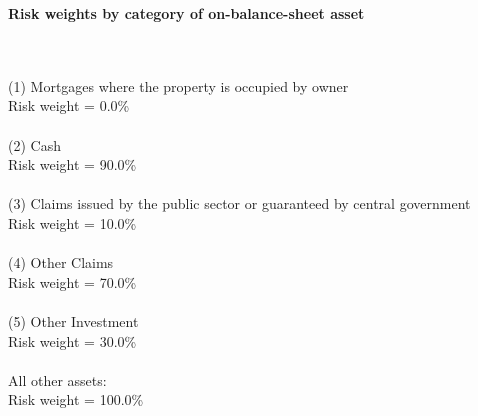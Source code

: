 \documentclass{article}
\begin{document}
\setlength{\parindent}{0em}
\begin{center}{\bf Risk weights by category of on-balance-sheet asset}\end{center}
~\\
~\\

(1) Mortgages where the property is occupied by owner \\
Risk weight = 0.0\%\\

~\\
(2) Cash\\
Risk weight = 90.0\%\\

~\\
(3) Claims issued by the public sector or guaranteed by central government \\
Risk weight = 10.0\%\\

~\\
(4) Other Claims\\
Risk weight = 70.0\%\\

~\\
(5) Other Investment\\
Risk weight = 30.0\%\\

~\\
All other assets:\\
Risk weight = 100.0\%\\

~\\
\end{document}
